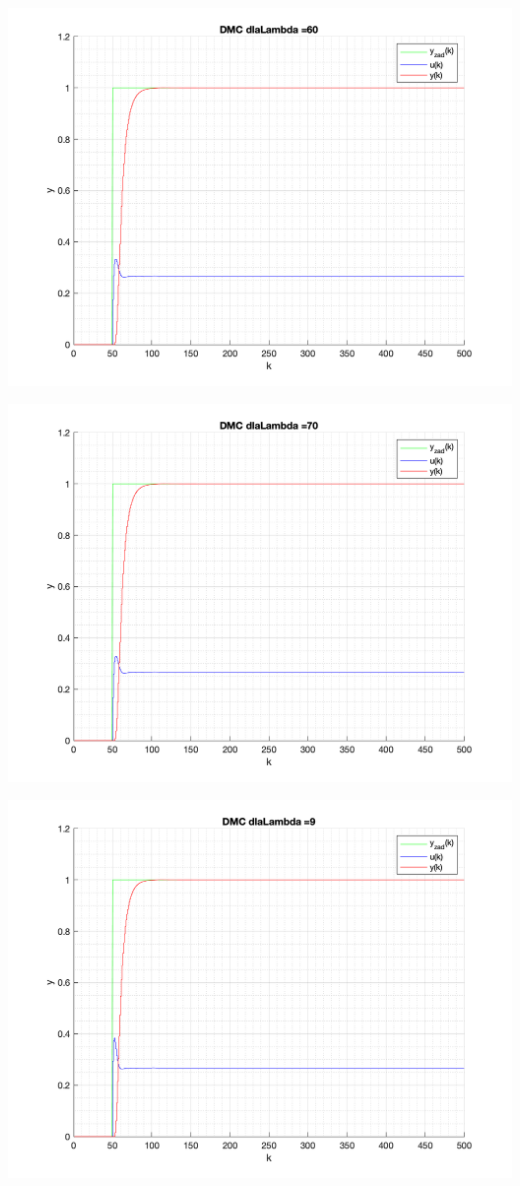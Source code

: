 \documentclass[a4paper, 11pt]{article}
\begin{document}
\begin{enumerate}
 \includegraphics[width=\linewidth]{./ModelsP4_Lambda/P4_DMC_Lambda_60_png.png} 
 
 \includegraphics[width=\linewidth]{./ModelsP4_Lambda/P4_DMC_Lambda_70_png.png} 
 
 \includegraphics[width=\linewidth]{./ModelsP4_Lambda/P4_DMC_Lambda_9_png.png} 
 

\end{enumerate}
\end{document}
